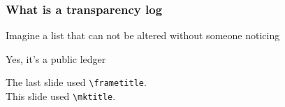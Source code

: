 \begin{frame}
  \frametitle{What is a transparency log}

  Imagine a list that can not be altered without someone noticing

  \pause

  Yes, it's a public ledger

\end{frame}

\begin{frame}

	The last slide used \texttt{\textbackslash{frametitle}}.\\
	This slide used \texttt{\textbackslash{mktitle}}.
\end{frame}

